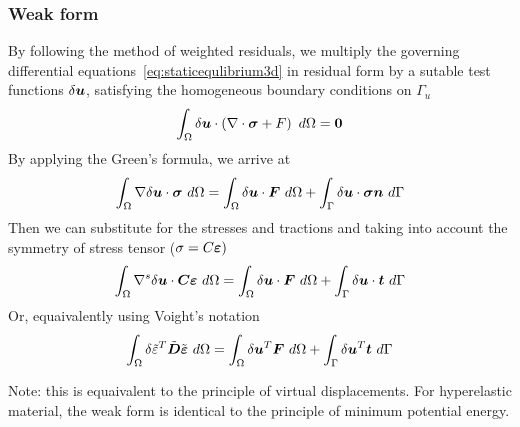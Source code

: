 \documentclass[11pt]{article}
\begin{document}
\subsubsection{Weak form}

  By following the method of weighted residuals, we multiply the governing differential equations~\ref{eq:staticequlibrium3d} in residual form by a sutable test functions $\delta\mbox{\boldmath$u$}$, satisfying the homogeneous boundary conditions on $\Gamma_u$
  $$
  \int_\Omega \delta\mbox{\boldmath$u$} \cdot \left(
  \nabla\cdot\mbox{\boldmath$\sigma$} + F \right)\ d\Omega = \mbox{\boldmath$0$}
  $$
  By applying the Green's formula, we arrive at
  $$
  \int_\Omega\grad\delta\mbf{u}\cdot\mbf{\sigma}\ d\Omega =
  \int_\Omega\delta\mbf{u}\cdot\mbf{F}\ d\Omega + \int_\Gamma\delta\mbf{u}\cdot\mbf{\sigma}\mbf{n}\ d\Gamma
  $$
  Then we can substitute for the stresses and tractions and taking into account the symmetry of stress tensor ($\sigma=C\mbox{\boldmath$\varepsilon$})$
  \begin{equation}
  \int_\Omega\grad^s\delta\mbf{u}\cdot\mbf{C}\mbf{\eps}\ d\Omega =
  \int_\Omega\delta\mbf{u}\cdot\mbf{F}\ d\Omega + \int_\Gamma\delta\mbf{u}\cdot\mbf{t}\ d\Gamma
  \label{weakform3d}
  \end{equation}
  Or, equaivalently using Voight's notation
  \begin{equation}
  \int_\Omega\delta\tilde{\eps}^T\tilde{\mbf{D}}\tilde{\mbf{\eps}}\ d\Omega =
  \int_\Omega\delta\mbf{u}^T\mbf{F}\ d\Omega + \int_\Gamma\delta\mbf{u}^T\mbf{t}\ d\Gamma
  \label{eq:weakformvoight}
  \end{equation}
  
  Note: this is equaivalent to the principle of virtual displacements. For hyperelastic material, the weak form is identical to the principle of minimum potential energy.

  
\end{document}
